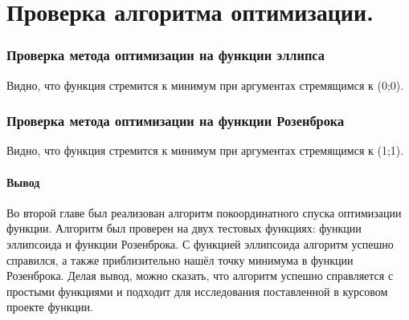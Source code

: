 \documentclass[a4paper, 12pt]{article}
\begin{document}
\newpage
\part{Проверка алгоритма оптимизации.}
\setcounter{section}{0}
\section{Проверка метода оптимизации на функции эллипса}
Видно, что функция стремится к минимум при аргументах стремящимся к (0;0).
\begin{center}
\end{center}

\section{Проверка метода оптимизации на функции Розенброка}
Видно, что функция стремится к минимум при аргументах стремящимся к (1;1).
\begin{center}
\end{center}

\subsection{Вывод}
Во второй главе был реализован алгоритм покоординатного спуска оптимизации функции. Алгоритм был проверен на двух тестовых функциях: функции эллипсоида и функции Розенброка. С функцией эллипсоида алгоритм успешно справился, а также приблизительно нашёл точку минимума в функции Розенброка. Делая вывод, можно сказать, что алгоритм успешно справляется с простыми функциями и подходит для исследования поставленной в курсовом проекте функции. 
\end{document}
